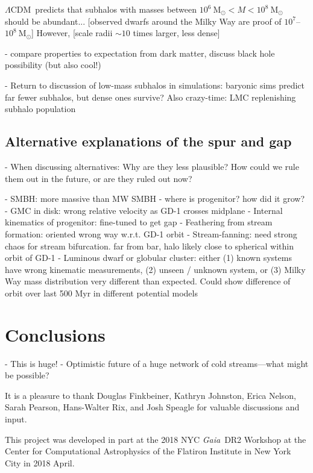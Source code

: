 \documentclass[12pt, modern]{aastex62}
\newcommand{\acronym}[1]{{\small{#1}}}
\newcommand{\Gaia}{\textsl{Gaia}}
\newcommand{\lcdm}{\acronym{$\Lambda$CDM}}
\newcommand{\msun}{\textrm{M}_\odot}
\begin{document}
\lcdm\ predicts that subhalos with masses between $10^6~\msun < M < 10^8~\msun$ should be abundant...
[observed dwarfs around the Milky Way are proof of $10^7$--$10^8~\msun$]
However, [scale radii $\sim 10$ times larger, less dense]

- compare properties to expectation from dark matter, discuss black hole possibility (but also cool!)

- Return to discussion of low-mass subhalos in simulations: baryonic sims predict far fewer subhalos, but dense ones survive? Also crazy-time: LMC replenishing subhalo population

\subsection{Alternative explanations of the spur and gap}
- When discussing alternatives: Why are they less plausible? How could we rule them out in the future, or are they ruled out now?

- SMBH: more massive than MW SMBH - where is progenitor? how did it grow?
- GMC in disk: wrong relative velocity as GD-1 crosses midplane
- Internal kinematics of progenitor: fine-tuned to get gap
- Feathering from stream formation: oriented wrong way w.r.t. GD-1 orbit
- Stream-fanning: need strong chaos for stream bifurcation. far from bar, halo likely close to spherical within orbit of GD-1
- Luminous dwarf or globular cluster: either (1) known systems have wrong kinematic measurements, (2) unseen / unknown system, or (3) Milky Way mass distribution very different than expected. Could show difference of orbit over last 500 Myr in different potential models


\section{Conclusions}

- This is huge!
- Optimistic future of a huge network of cold streams---what might be possible?


\acknowledgements
It is a pleasure to thank
Douglas Finkbeiner,
Kathryn Johnston,
Erica Nelson,
Sarah Pearson,
Hans-Walter Rix, and
Josh Speagle for valuable discussions and input.

This project was developed in part at the 2018 \acronym{NYC} \Gaia\ \acronym{DR2} Workshop at the Center for Computational Astrophysics of the Flatiron Institute in New York City in 2018 April.
\end{document}
